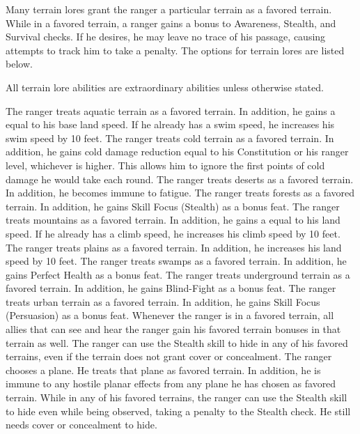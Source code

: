 Many terrain lores grant the ranger a particular terrain as a favored terrain.
While in a favored terrain, a ranger gains a  bonus to Awareness, Stealth, and Survival checks.
If he desires, he may leave no trace of his passage, causing attempts to track him to take a  penalty.
The options for terrain lores are listed below.

All terrain lore abilities are extraordinary abilities unless otherwise stated.

    The ranger treats aquatic terrain as a favored terrain.
    In addition, he gains a  equal to his base land speed.
    If he already has a swim speed, he increases his swim speed by 10 feet.
    The ranger treats cold terrain as a favored terrain.
    In addition, he gains cold damage reduction equal to his Constitution or his ranger level, whichever is higher.
    This allows him to ignore the first points of cold damage he would take each round.
    The ranger treats deserts as a favored terrain.
    In addition, he becomes immune to fatigue.
    The ranger treats forests as a favored terrain.
    In addition, he gains Skill Focus (Stealth) as a bonus feat.
    The ranger treats mountains as a favored terrain.
    In addition, he gains a  equal to his land speed.
    If he already has a climb speed, he increases his climb speed by 10 feet.
    The ranger treats plains as a favored terrain.
    In addition, he increases his land speed by 10 feet.
    The ranger treats swamps as a favored terrain.
    In addition, he gains Perfect Health as a bonus feat.
    The ranger treats underground terrain as a favored terrain.
    In addition, he gains Blind-Fight as a bonus feat.
    The ranger treats urban terrain as a favored terrain.
    In addition, he gains Skill Focus (Persuasion) as a bonus feat.
    Whenever the ranger is in a favored terrain, all allies that can see and hear the ranger gain his favored terrain bonuses in that terrain as well.
    The ranger can use the Stealth skill to hide in any of his favored terrains, even if the terrain does not grant cover or concealment.
    The ranger chooses a plane.
    He treats that plane as favored terrain.
    In addition, he is immune to any hostile planar effects from any plane he has chosen as favored terrain.
    While in any of his favored terrains, the ranger can use the Stealth skill to hide even while being observed, taking a  penalty to the Stealth check.
    He still needs cover or concealment to hide.

